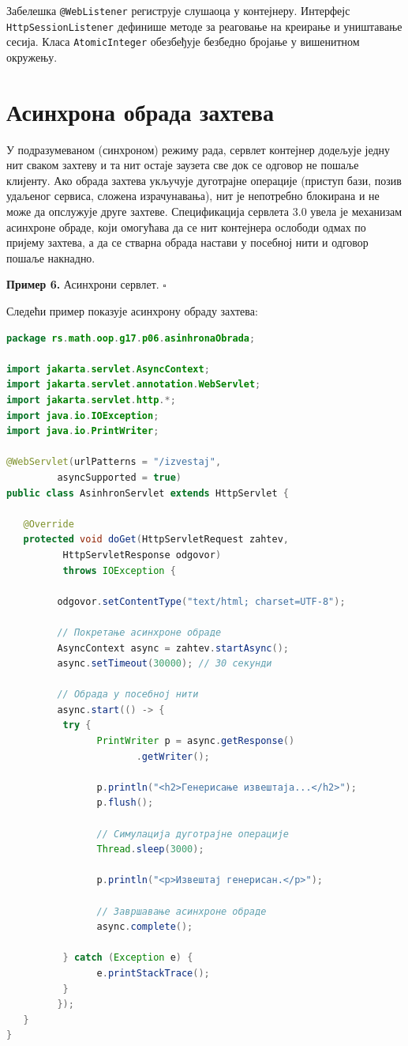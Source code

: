 Забелешка \texttt{@WebListener} региструје слушаоца у контејнеру. Интерфејс \texttt{HttpSessionListener} дефинише методе за реаговање на креирање и уништавање сесија. Класа \texttt{AtomicInteger} обезбеђује безбедно бројање у вишенитном окружењу.


\section{Асинхрона обрада захтева}

У подразумеваном (синхроном) режиму рада, сервлет контејнер додељује једну нит сваком захтеву и та нит остаје заузета све док се одговор не пошаље клијенту. Ако обрада захтева укључује дуготрајне операције (приступ бази, позив удаљеног сервиса, сложена израчунавања), нит је непотребно блокирана и не може да опслужује друге захтеве. Спецификација сервлета 3.0 увела је механизам асинхроне обраде, који омогућава да се нит контејнера ослободи одмах по пријему захтева, а да се стварна обрада настави у посебној нити и одговор пошаље накнадно.


\bigskip

\noindent \textbf{Пример 6.} Асинхрони сервлет. $\square$

\medskip

Следећи пример показује асинхрону обраду захтева:


\begin{lstlisting}[language=Java]
package rs.math.oop.g17.p06.asinhronaObrada;
 
import jakarta.servlet.AsyncContext;
import jakarta.servlet.annotation.WebServlet;
import jakarta.servlet.http.*;
import java.io.IOException;
import java.io.PrintWriter;
 
@WebServlet(urlPatterns = "/izvestaj",
         asyncSupported = true)
public class AsinhronServlet extends HttpServlet {
 
   @Override
   protected void doGet(HttpServletRequest zahtev,
          HttpServletResponse odgovor)
          throws IOException {
 
         odgovor.setContentType("text/html; charset=UTF-8");
 
         // Покретање асинхроне обраде
         AsyncContext async = zahtev.startAsync();
         async.setTimeout(30000); // 30 секунди
 
         // Обрада у посебној нити
         async.start(() -> {
          try {
                PrintWriter p = async.getResponse()
                       .getWriter();
 
                p.println("<h2>Генерисање извештаја...</h2>");
                p.flush();
 
                // Симулација дуготрајне операције
                Thread.sleep(3000);
 
                p.println("<p>Извештај генерисан.</p>");
 
                // Завршавање асинхроне обраде
                async.complete();
 
          } catch (Exception e) {
                e.printStackTrace();
          }
         });
   }
}
\end{lstlisting}


